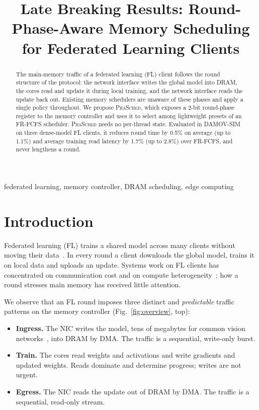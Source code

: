 \documentclass[conference]{IEEEtran}
\newcommand{\name}{\textsc{PhaSched}}
\begin{document}
\title{Late Breaking Results: Round-Phase-Aware Memory Scheduling for Federated Learning Clients}

\author{
}

\maketitle

\begin{abstract}
The main-memory traffic of a federated learning (FL) client follows the round structure of the protocol: the network interface writes the global model into DRAM, the cores read and update it during local training, and the network interface reads the update back out. Existing memory schedulers are unaware of these phases and apply a single policy throughout. We propose \name{}, which exposes a 2-bit round-phase register to the memory controller and uses it to select among lightweight presets of an FR-FCFS scheduler. \name{} needs no per-thread state. Evaluated in DAMOV-SIM on three dense-model FL clients, it reduces round time by 0.5\% on average (up to 1.1\%) and average training read latency by 1.7\% (up to 2.8\%) over FR-FCFS, and never lengthens a round.
\end{abstract}

\begin{IEEEkeywords}
federated learning, memory controller, DRAM scheduling, edge computing
\end{IEEEkeywords}

\section{Introduction}
Federated learning (FL) trains a shared model across many clients without moving their data~\cite{fedavg}. In every round a client downloads the global model, trains it on local data and uploads an update. Systems work on FL clients has concentrated on communication cost and on compute heterogeneity~\cite{flscale,flopen}; how a round stresses main memory has received little attention.

We observe that an FL round imposes three distinct and \emph{predictable} traffic patterns on the memory controller (Fig.~\ref{fig:overview}, top):
\begin{itemize}
\item \textbf{Ingress.} The NIC writes the model, tens of megabytes for common vision networks~\cite{resnet}, into DRAM by DMA. The traffic is a sequential, write-only burst.
\item \textbf{Train.} The cores read weights and activations and write gradients and updated weights. Reads dominate and determine progress; writes are not urgent.
\item \textbf{Egress.} The NIC reads the update out of DRAM by DMA. The traffic is a sequential, read-only stream.
\end{itemize}
\end{document}
